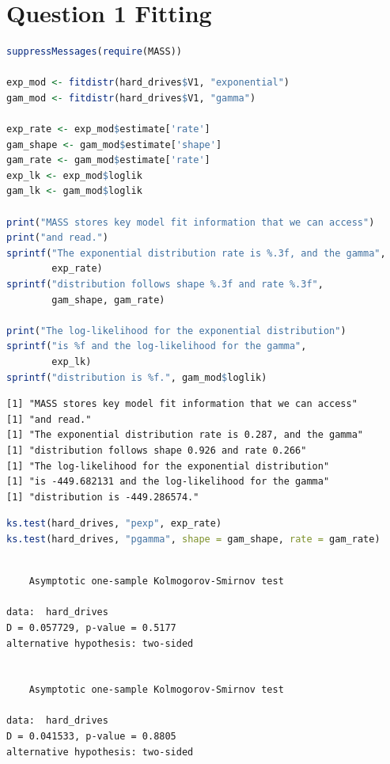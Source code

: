\documentclass[a4paper]{article}
\begin{document}
\section{Question 1 Fitting}
\label{sec:orgbaba261}
\begin{lstlisting}[language=r,label=lst:orge9711ed,caption={Question 1: fitting gamma and exponential distributions},captionpos=b,numbers=none]
suppressMessages(require(MASS))

exp_mod <- fitdistr(hard_drives$V1, "exponential")
gam_mod <- fitdistr(hard_drives$V1, "gamma")

exp_rate <- exp_mod$estimate['rate']
gam_shape <- gam_mod$estimate['shape']
gam_rate <- gam_mod$estimate['rate']
exp_lk <- exp_mod$loglik
gam_lk <- gam_mod$loglik

print("MASS stores key model fit information that we can access")
print("and read.")
sprintf("The exponential distribution rate is %.3f, and the gamma",
        exp_rate)
sprintf("distribution follows shape %.3f and rate %.3f",
        gam_shape, gam_rate)

print("The log-likelihood for the exponential distribution")
sprintf("is %f and the log-likelihood for the gamma",
        exp_lk)
sprintf("distribution is %f.", gam_mod$loglik)

\end{lstlisting}

\label{org56740ed}
\begin{verbatim}
[1] "MASS stores key model fit information that we can access"
[1] "and read."
[1] "The exponential distribution rate is 0.287, and the gamma"
[1] "distribution follows shape 0.926 and rate 0.266"
[1] "The log-likelihood for the exponential distribution"
[1] "is -449.682131 and the log-likelihood for the gamma"
[1] "distribution is -449.286574."
\end{verbatim}

\begin{lstlisting}[language=r,label=lst:org5cd8758,caption={Question 1: Kolmogorov-Smirnov tests},captionpos=b,numbers=none]
ks.test(hard_drives, "pexp", exp_rate)
ks.test(hard_drives, "pgamma", shape = gam_shape, rate = gam_rate)
\end{lstlisting}

\label{org1bf31d6}
\begin{verbatim}

	Asymptotic one-sample Kolmogorov-Smirnov test

data:  hard_drives
D = 0.057729, p-value = 0.5177
alternative hypothesis: two-sided


	Asymptotic one-sample Kolmogorov-Smirnov test

data:  hard_drives
D = 0.041533, p-value = 0.8805
alternative hypothesis: two-sided
\end{verbatim}
\end{document}
